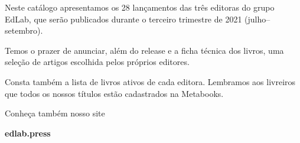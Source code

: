 
\hspace*{-7cm}\hrulefill\hspace*{-7cm}

\vspace{1cm}

\hspace*{-.5cm}\parbox{180pt}{\raggedright 
Neste catálogo apresentamos os 28
lançamentos das três editoras do grupo EdLab, que serão publicados durante o
terceiro trimestre de 2021 (julho--setembro). 

Temos o prazer de anunciar, além do release e a ficha técnica dos livros, uma 
seleção de artigos escolhida pelos próprios editores. 

Consta também a lista de 
livros ativos de cada editora. Lembramos aos livreiros que todos os nossos títulos
estão cadastrados na Metabooks.

Conheça também nosso site

\textbf{edlab.press}
}\pagebreak
\pagestyle{grid}
